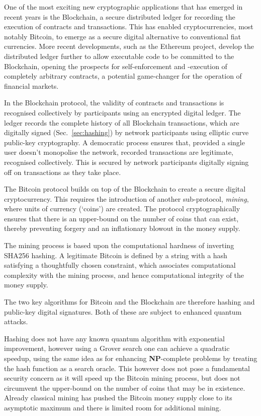 One of the most exciting new cryptographic applications that has emerged in recent years is the Blockchain, a secure distributed ledger for recording the execution of contracts and transactions. This has enabled cryptocurrencies, most notably Bitcoin, to emerge as a secure digital alternative to conventional fiat currencies. More recent developments, such as the Ethereum project, develop the distributed ledger further to allow executable code to be committed to the Blockchain, opening the prospects for self-enforcement and -execution of completely arbitrary contracts, a potential game-changer for the operation of financial markets.

In the Blockchain protocol, the validity of contracts and transactions is recognised collectively by participants using an encrypted digital ledger. The ledger records the complete history of all Blockchain transactions, which are digitally signed (Sec.~\ref{sec:hashing}) by network participants using elliptic curve public-key cryptography. A democratic process ensures that, provided a single user doesn't monopolise the network, recorded transactions are legitimate, recognised collectively. This is secured by network participants digitally signing off on transactions as they take place.

The Bitcoin protocol builds on top of the Blockchain to create a secure digital cryptocurrency. This requires the introduction of another sub-protocol, \textit{mining}, where units of currency (`coins') are created. The protocol cryptographically ensures that there is an upper-bound on the number of coins that can exist, thereby preventing forgery and an inflationary blowout in the money supply.

The mining process is based upon the computational hardness of inverting SHA256 hashing. A legitimate Bitcoin is defined by a string with a hash satisfying a thoughtfully chosen constraint, which associates computational complexity with the mining process, and hence computational integrity of the money supply.

The two key algorithms for Bitcoin and the Blockchain are therefore hashing and public-key digital signatures. Both of these are subject to enhanced quantum attacks.

Hashing does not have any known quantum algorithm with exponential improvement, however using a Grover search one can achieve a quadratic speedup, using the same idea as for enhancing \textbf{NP}-complete problems by treating the hash function as a search oracle. This however does not pose a fundamental security concern as it will speed up the Bitcoin mining process, but does not circumvent the upper-bound on the number of coins that may be in existence. Already classical mining has pushed the Bitcoin money supply close to its asymptotic maximum and there is limited room for additional mining.

